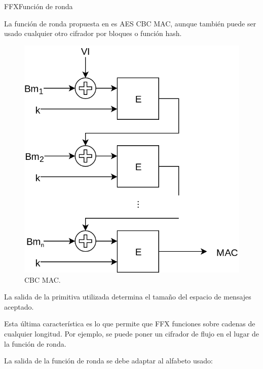 \begin{frame}{FFX}{Función de ronda}

  {
    La función de ronda propuesta en \cite{ffx_2} es AES CBC MAC, aunque también
    puede ser usado cualquier otro cifrador por bloques o función hash.

    \begin{figure}[H]
      \begin{center}
        \includegraphics[height=0.35\textheight]{diagramas/cbc_mac.png}
        \caption{CBC MAC.}
      \end{center}
    \end{figure}

    La salida de la primitiva utilizada determina el tamaño del espacio de
    mensajes aceptado.
  }

  {
    Esta última característica es lo que permite que FFX funciones sobre
    cadenas de cualquier longitud. Por ejemplo, se puede poner un cifrador
    de flujo en el lugar de la función de ronda.
  }

  {
    La salida de la función de ronda se debe adaptar al alfabeto usado:

    \begin{itemize}


\end{itemize}}
\end{frame}
